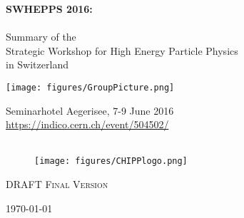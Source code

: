 \documentclass[10pt,a4paper]{article}
\begin{document}
\addtocounter{page}{-1}
\pagestyle{plain}
\begin{center}
{\large {\bf  SWHEPPS 2016:}\\
\ ~\\
Summary of the\\
 Strategic Workshop for High Energy Particle Physics \\
  in Switzerland }\\
\vspace{2cm}

 \texttt{[image: figures/GroupPicture.png]}
 
\vspace{6cm}

Seminarhotel Aegerisee, 7-9 June 2016 \\
\url{https://indico.cern.ch/event/504502/}  ~\\
\  ~\\


\vspace {-0.5cm}
 \begin{figure}[h]
   \centering
   \texttt{[image: figures/CHIPPlogo.png]}
 \end{figure}

\vspace{-0.6cm}
{\textsc {DRAFT Final Version}}

\today \\
\end{center}
\newpage 

%



%


%


%


%

\end{document}
